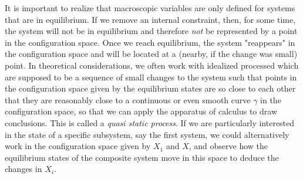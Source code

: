\documentclass[a4paper, draft]{report}
\numberwithin{section}{chapter}
\numberwithin{equation}{chapter}
\theoremstyle{own}
\theoremstyle{remark}
\begin{document}
It is important to realize that macroscopic variables are only defined for systems that are in equilibrium. If we remove an internal constraint,  then, for some time, the system will not be in equilibrium and therefore {\em not} be represented by a point in the configuration space. Once we reach equilibrium, the system "reappears" in the configuration space and will be located at a (nearby, if the change was small) point. In theoretical considerations, we often work with idealized processed which are supposed to be a sequence of small changes to the system such that points in the configuration space given by the equilibrium states are so close to each other that they are reasonably close to a continuous or even smooth curve $\gamma$ in the configuration space, so that we can apply the apparatus of calculus to draw conclusions. This is called a {\em quasi static process}. If we are particularly interested in the state of a specific subsystem, say the first system, we could alternatively work in the configuration space given by $X_1$ and $X$, and observe how the equilibrium states of the composite system move in this space to deduce the changes in $X_i$.
\end{document}
